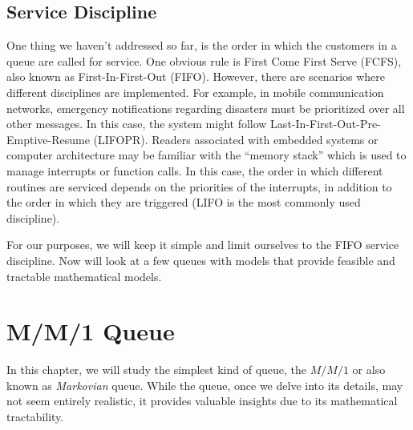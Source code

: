 \documentclass[11pt, a4paper]{report}
\begin{document}
\section{Service Discipline}
One thing we haven't addressed so far, is the order in which the customers in a queue are called for service. 
One obvious rule is First Come First Serve (FCFS), also known as First-In-First-Out (FIFO). However, there are scenarios where different disciplines are implemented. For example, in mobile communication networks, emergency notifications regarding disasters must be prioritized over all other messages. In this case, the system might follow Last-In-First-Out-Pre-Emptive-Resume (LIFOPR). Readers associated with embedded systems or computer architecture may be familiar with the ``memory stack'' which is used to manage interrupts or function calls. In this case, the order in which different routines are serviced depends on the priorities of the interrupts, in addition to the order in which they are triggered (LIFO is the most commonly used discipline).

For our purposes, we will keep it simple and limit ourselves to the FIFO service discipline. Now will look at a few queues with models that provide feasible and tractable mathematical models.

\chapter{M/M/1 Queue}
In this chapter, we will study the simplest kind of queue, the $M/M/1$ or also known as \emph{Markovian} queue. While the queue, once we delve into its details, may not seem entirely realistic, it provides valuable insights due to its mathematical tractability.

\end{document}
